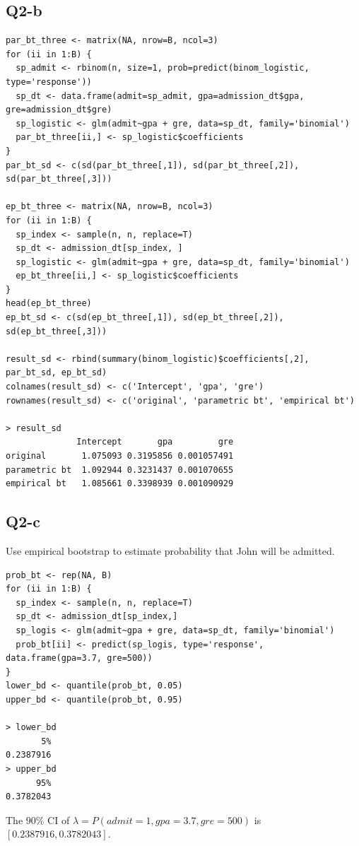 \documentclass[12pt,letterpaper]{article}
\begin{document}
\subsection*{Q2-b}
\begin{verbatim}
par_bt_three <- matrix(NA, nrow=B, ncol=3)
for (ii in 1:B) {
  sp_admit <- rbinom(n, size=1, prob=predict(binom_logistic, type='response'))
  sp_dt <- data.frame(admit=sp_admit, gpa=admission_dt$gpa, gre=admission_dt$gre)
  sp_logistic <- glm(admit~gpa + gre, data=sp_dt, family='binomial')
  par_bt_three[ii,] <- sp_logistic$coefficients
}
par_bt_sd <- c(sd(par_bt_three[,1]), sd(par_bt_three[,2]), sd(par_bt_three[,3]))

ep_bt_three <- matrix(NA, nrow=B, ncol=3)
for (ii in 1:B) {
  sp_index <- sample(n, n, replace=T)
  sp_dt <- admission_dt[sp_index, ]
  sp_logistic <- glm(admit~gpa + gre, data=sp_dt, family='binomial')
  ep_bt_three[ii,] <- sp_logistic$coefficients
}
head(ep_bt_three)
ep_bt_sd <- c(sd(ep_bt_three[,1]), sd(ep_bt_three[,2]), sd(ep_bt_three[,3]))

result_sd <- rbind(summary(binom_logistic)$coefficients[,2], par_bt_sd, ep_bt_sd)
colnames(result_sd) <- c('Intercept', 'gpa', 'gre')
rownames(result_sd) <- c('original', 'parametric bt', 'empirical bt')

> result_sd
              Intercept       gpa         gre
original       1.075093 0.3195856 0.001057491
parametric bt  1.092944 0.3231437 0.001070655
empirical bt   1.085661 0.3398939 0.001090929
\end{verbatim}

\subsection*{Q2-c}
\noindent Use empirical bootstrap to estimate probability that John will be admitted.
\begin{verbatim}
prob_bt <- rep(NA, B)
for (ii in 1:B) {
  sp_index <- sample(n, n, replace=T)
  sp_dt <- admission_dt[sp_index,]
  sp_logis <- glm(admit~gpa + gre, data=sp_dt, family='binomial')
  prob_bt[ii] <- predict(sp_logis, type='response', data.frame(gpa=3.7, gre=500))
}
lower_bd <- quantile(prob_bt, 0.05)
upper_bd <- quantile(prob_bt, 0.95)

> lower_bd
       5% 
0.2387916 
> upper_bd
      95% 
0.3782043 
\end{verbatim}

\noindent The $90 \%$ CI of $\lambda = P(admit=1, gpa=3.7, gre=500)$ is $[0.2387916 , 0.3782043]$.
\end{document}
